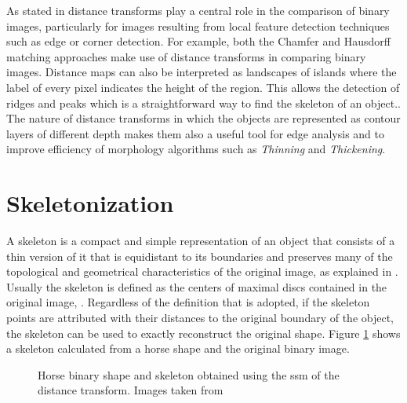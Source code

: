 As stated in \cite{dtresearch2} 
distance transforms play a central role in the comparison of binary images, 
particularly for images resulting from local feature detection techniques such 
as edge or corner detection. For example, both the Chamfer
and Hausdorff matching approaches make use of distance transforms in comparing binary images. 
Distance maps can also be interpreted as landscapes of islands 
where the label of every pixel indicates the height of the region. This allows
the detection of ridges and peaks which is a straightforward way to find the
skeleton of an object.\cite[237]{ridgedt}. The nature of distance transforms
in which the objects are represented as contour layers of different depth
makes them also a useful tool for edge analysis and to improve efficiency of 
morphology algorithms such as \emph{Thinning} and \emph{Thickening}.\\

\section{Skeletonization}
\label{sec:skeletonization}

A skeleton is a compact and simple representation of an object that consists of a thin
version of it that is equidistant to its boundaries and preserves many of
the topological and geometrical characteristics of the original image, as explained in
\cite{wikipedia:skeleton,ssm,augmented}. Usually the skeleton is defined as the centers
of maximal discs contained in the original image, \cite{ssm,augmented}.
Regardless of the definition that is adopted, if the skeleton points are attributed with their distances
to the original boundary of the object, the skeleton can be used to exactly 
reconstruct the original shape. Figure \ref{fig:genskeleton} shows a skeleton calculated
from a horse shape and the original binary image.\\

\begin{figure}[h t b p ! H]
  \centering
\qquad
  \caption{Horse binary shape and skeleton obtained using the ssm of the distance transform. Images taken from \cite{ssm}}
  \label{fig:genskeleton}
\end{figure}


